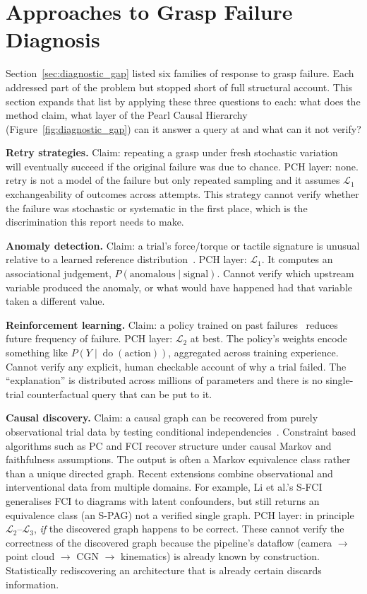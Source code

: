 \documentclass[11pt,a4paper]{report}
\newcommand{\doop}{\operatorname{do}}
\begin{document}
\section{Approaches to Grasp Failure Diagnosis}
\label{sec:bg_diagnosis}

Section~\ref{sec:diagnostic_gap} listed six families of response to grasp failure. Each addressed part of the problem but stopped short of full structural account. This section expands that list by applying these three questions to each: what does the method claim, what layer of the Pearl Causal Hierarchy (Figure~\ref{fig:diagnostic_gap}) can it answer a query at and what can it not verify?

\textbf{Retry strategies.} Claim: repeating a grasp under fresh stochastic variation~\cite{hsiao2010contact} will eventually succeed if the original failure was due to chance. PCH layer: none. retry is not a model of the failure but only repeated sampling and it assumes $\mathcal{L}_1$ exchangeability of outcomes across attempts. This strategy cannot verify whether the failure was stochastic or systematic in the first place, which is the discrimination this report needs to make.

\textbf{Anomaly detection.} Claim: a trial's force/torque or tactile signature is unusual relative to a learned reference distribution~\cite{park2018multimodal}. PCH layer: $\mathcal{L}_1$. It computes an associational judgement, $P(\text{anomalous} \mid \text{signal})$. Cannot verify which upstream variable produced the anomaly, or what would have happened had that variable taken a different value.

\textbf{Reinforcement learning.} Claim: a policy trained on past failures~\cite{levine2018learning, kalashnikov2018scalable} reduces future frequency of failure. PCH layer: $\mathcal{L}_2$ at best. The policy's weights encode something like $P(Y \mid \doop(\text{action}))$, aggregated across training experience. Cannot verify any explicit, human checkable account of why a trial failed. The ``explanation'' is distributed across millions of parameters and there is no single-trial counterfactual query that can be put to it.

\textbf{Causal discovery.} Claim: a causal graph can be recovered from purely observational trial data by testing conditional independencies~\cite{glymour2019review}. Constraint based algorithms such as PC and FCI recover structure under causal Markov and faithfulness assumptions. The output is often a Markov equivalence class rather than a unique directed graph. Recent extensions combine observational and interventional data from multiple domains. For example, Li et al.'s S-FCI~\cite{li2023sfci} generalises FCI to diagrams with latent confounders, but still returns an equivalence class (an S-PAG) not a verified single graph. PCH layer: in principle $\mathcal{L}_2$--$\mathcal{L}_3$, \emph{if} the discovered graph happens to be correct. These cannot verify the correctness of the discovered graph because the pipeline's dataflow (camera $\to$ point cloud $\to$ CGN $\to$ kinematics) is already known by construction. Statistically rediscovering an architecture that is already certain discards information.
\end{document}
